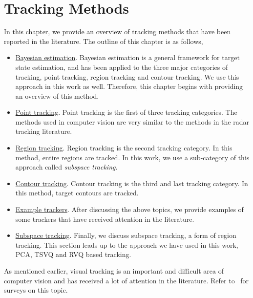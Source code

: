 %
%
%

\chapter{Tracking Methods}
\label{chap_TRK}	
In this chapter, we provide an overview of tracking methods that have been reported in the literature.  The outline of this chapter is as follows,

\begin{itemize}
\item \underline{Bayesian estimation}.  Bayesian estimation is a general framework for target state estimation, and has been applied to the three major categories of tracking, point tracking, region tracking and contour tracking.  We use this approach in this work as well.  Therefore, this chapter begins with providing an overview of this method.
\item \underline{Point tracking}.  Point tracking is the first of three tracking categories.  The methods used in computer vision are very similar to the methods in the radar tracking literature.
\item \underline{Region tracking}.  Region tracking is the second tracking category.  In this method, entire regions are tracked.  In this work, we use a sub-category of this approach called \emph{subspace tracking}.
\item \underline{Contour tracking}.  Contour tracking is the third and last tracking category.  In this method, target contours are tracked.
\item \underline{Example trackers}.  After discussing the above topics, we provide examples of some trackers that have received attention in the literature.
\item \underline{Subspace tracking}.  Finally, we discuss subspace tracking, a form of region tracking.  This section leads up to the approach we have used in this work, PCA, TSVQ and RVQ based tracking.
\end{itemize}

As mentioned earlier, visual tracking is an important and difficult area of computer vision and has received a lot of attention in the literature.  Refer to~\cite{2006_JNL_SURVEYtrk_Trucco, 2006_JNL_SURVEYtrk_Yilmaz, 2008_REP_SURVEYtrk_Cannons} for surveys on this topic.

